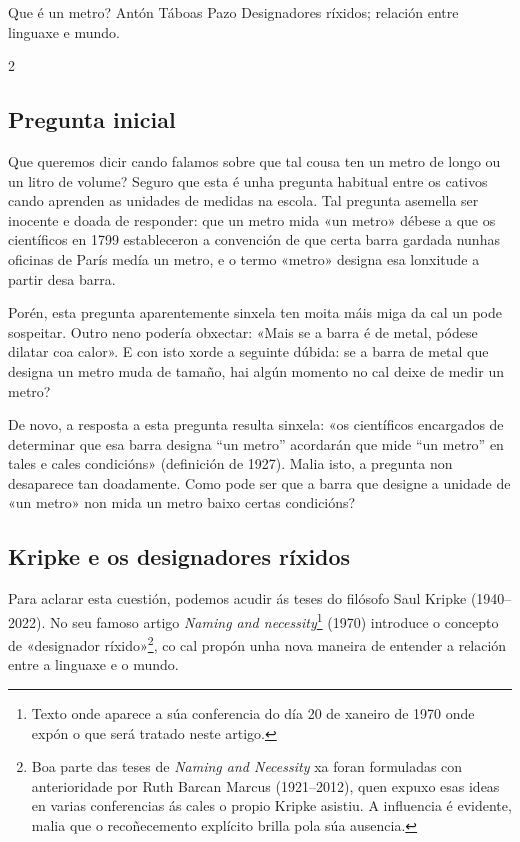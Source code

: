 \Artigo*%
{filosofia}%
{Que é un metro?}%
{Antón Táboas Pazo}%
{Designadores ríxidos; relación entre linguaxe e mundo.}%

\begin{multicols}{2}

\subsection*{Pregunta inicial}

Que queremos dicir cando falamos sobre que tal cousa ten un metro de longo ou
un litro de volume? Seguro que esta é unha pregunta habitual entre os cativos
cando aprenden as unidades de medidas na escola. Tal pregunta asemella ser
inocente e doada de responder: que un metro mida «un metro» débese a que os
científicos en 1799 estableceron a convención de que certa barra gardada nunhas
oficinas de París medía un metro, e o termo «metro» designa esa lonxitude a
partir desa barra.

Porén, esta pregunta aparentemente sinxela ten moita máis miga da cal un pode
sospeitar. Outro neno podería obxectar: «Mais se a barra é de metal, pódese
dilatar coa calor». E con isto xorde a seguinte dúbida: se a barra de metal que
designa un metro muda de tamaño, hai algún momento no cal deixe de medir un
metro?

De novo, a resposta a esta pregunta resulta sinxela: «os científicos encargados
de determinar que esa barra designa “un metro” acordarán que mide “un metro” en
tales e cales condicións» (definición de 1927). Malia isto, a pregunta non
desaparece tan doadamente. Como pode ser que a barra que designe a unidade de
«un metro» non mida un metro baixo certas condicións?

\subsection*{Kripke e os designadores ríxidos}

Para aclarar esta cuestión, podemos acudir ás teses do filósofo Saul Kripke
(1940–2022). No seu famoso artigo \textit{Naming and necessity}\footnote{Texto
onde aparece a súa conferencia do día 20 de xaneiro de 1970 onde expón o que
será tratado neste artigo.} (1970)  introduce o concepto de «designador
ríxido»\footnote{Boa parte das teses de \textit{Naming and Necessity} xa foran
formuladas con anterioridade por Ruth Barcan Marcus (1921–2012), quen expuxo
esas ideas en varias conferencias ás cales o propio Kripke asistiu. A
influencia é evidente, malia que o recoñecemento explícito brilla pola súa
ausencia.}, co cal propón unha nova maneira de entender a relación entre a
linguaxe e o mundo.


\end{multicols}
